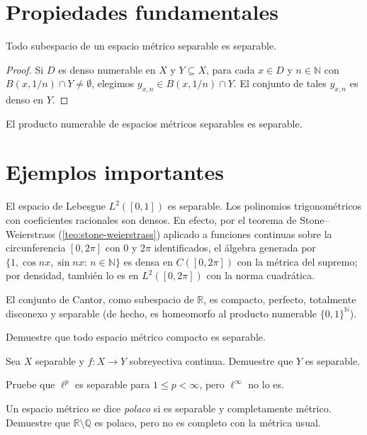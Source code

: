 \section{Propiedades fundamentales}

\begin{theorem}
\label{teo:separable-herencia}
Todo subespacio de un espacio métrico separable es separable.
\end{theorem}
\begin{proof}
Si $D$ es denso numerable en $X$ y $Y\subseteq X$, para cada $x\in D$ y $n\in\mathbb{N}$ con $B(x,1/n)\cap Y\neq\emptyset$, elegimos $y_{x,n}\in B(x,1/n)\cap Y$. El conjunto de tales $y_{x,n}$ es denso en $Y$.
\end{proof}

\begin{theorem}
\label{teo:producto-separable}
El producto numerable de espacios métricos separables es separable.
\end{theorem}

\section{Ejemplos importantes}

\begin{example}
\label{ej:l2-separable}
El espacio de Lebesgue $L^2([0,1])$ es separable. Los polinomios trigonométricos con coeficientes racionales son densos. En efecto, por el teorema de Stone--Weierstrass (\cref{teo:stone-weierstrass}) aplicado a funciones continuas sobre la circunferencia $[0,2\pi]$ con $0$ y $2\pi$ identificados, el álgebra generada por $\{1,\cos nx,\sin nx:\,n\in\mathbb{N}\}$ es densa en $C([0,2\pi])$ con la métrica del supremo; por densidad, también lo es en $L^2([0,2\pi])$ con la norma cuadrática.
\end{example}

\begin{example}
\label{ej:cantor-separable}
El conjunto de Cantor, como subespacio de $\mathbb{R}$, es compacto, perfecto, totalmente disconexo y separable (de hecho, es homeomorfo al producto numerable $\{0,1\}^{\mathbb{N}}$).
\end{example}

\begin{exercise}
Demuestre que todo espacio métrico compacto es separable.
\end{exercise}

\begin{exercise}
Sea $X$ separable y $f\colon X\to Y$ sobreyectiva continua. Demuestre que $Y$ es separable.
\end{exercise}

\begin{exercise}
Pruebe que $\ell^p$ es separable para $1\leq p<\infty$, pero $\ell^{\infty}$ no lo es.
\end{exercise}

\begin{problem}
Un espacio métrico se dice \emph{polaco} si es separable y completamente métrico. Demuestre que $\mathbb{R}\setminus\mathbb{Q}$ es polaco, pero no es completo con la métrica usual.
\end{problem}
